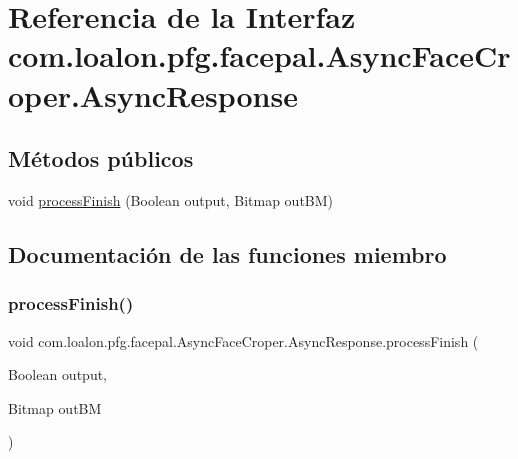 \hypertarget{interfacecom_1_1loalon_1_1pfg_1_1facepal_1_1_async_face_croper_1_1_async_response}{}\section{Referencia de la Interfaz com.\+loalon.\+pfg.\+facepal.\+Async\+Face\+Croper.\+Async\+Response}
\label{interfacecom_1_1loalon_1_1pfg_1_1facepal_1_1_async_face_croper_1_1_async_response}
\subsection*{Métodos públicos}
\begin{DoxyCompactItemize}
\item 
void \mbox{\hyperlink{interfacecom_1_1loalon_1_1pfg_1_1facepal_1_1_async_face_croper_1_1_async_response_a4ab44c680b82ae478b409e8869e819b6}{process\+Finish}} (Boolean output, Bitmap out\+BM)
\end{DoxyCompactItemize}


\subsection{Documentación de las funciones miembro}
\mbox{\label{interfacecom_1_1loalon_1_1pfg_1_1facepal_1_1_async_face_croper_1_1_async_response_a4ab44c680b82ae478b409e8869e819b6}} 
\subsubsection{\texorpdfstring{process\+Finish()}{processFinish()}}
{\footnotesize\ttfamily void com.\+loalon.\+pfg.\+facepal.\+Async\+Face\+Croper.\+Async\+Response.\+process\+Finish (\begin{DoxyParamCaption}\item[{Boolean}]{output,  }\item[{Bitmap}]{out\+BM }\end{DoxyParamCaption})}

